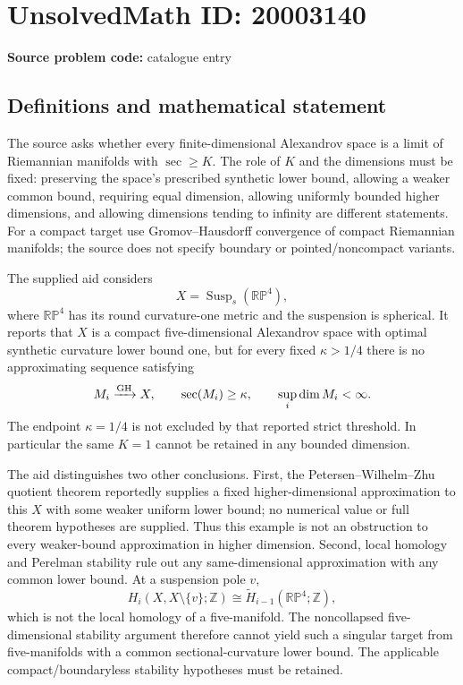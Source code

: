 \documentclass[11pt]{article}
\newcommand{\Z}{\mathbb{Z}}
\newcommand{\R}{\mathbb{R}}
\newcommand{\PP}{\mathbb{P}}
\begin{document}
\section*{UnsolvedMath ID: 20003140}
\textbf{Source problem code:} catalogue entry
\subsection{Definitions and mathematical statement}
The source asks whether every finite-dimensional Alexandrov space is a limit of Riemannian manifolds with \(\sec\ge K\). The role of \(K\) and the dimensions must be fixed: preserving the space's prescribed synthetic lower bound, allowing a weaker common bound, requiring equal dimension, allowing uniformly bounded higher dimensions, and allowing dimensions tending to infinity are different statements. For a compact target use Gromov--Hausdorff convergence of compact Riemannian manifolds; the source does not specify boundary or pointed/noncompact variants.

The supplied aid considers
\[
X=\operatorname{Susp}_s(\R\PP^4),
\]
where \(\R\PP^4\) has its round curvature-one metric and the suspension is spherical. It reports that \(X\) is a compact five-dimensional Alexandrov space with optimal synthetic curvature lower bound one, but for every fixed \(\kappa>1/4\) there is no approximating sequence satisfying
\[
M_i\xrightarrow{\rm GH}X,\qquad \sec(M_i)\ge\kappa,\qquad \sup_i\dim M_i<\infty.
\]
The endpoint \(\kappa=1/4\) is not excluded by that reported strict threshold. In particular the same \(K=1\) cannot be retained in any bounded dimension.

The aid distinguishes two other conclusions. First, the Petersen--Wilhelm--Zhu quotient theorem reportedly supplies a fixed higher-dimensional approximation to this \(X\) with some weaker uniform lower bound; no numerical value or full theorem hypotheses are supplied. Thus this example is not an obstruction to every weaker-bound approximation in higher dimension. Second, local homology and Perelman stability rule out any same-dimensional approximation with any common lower bound. At a suspension pole \(v\),
\[
H_i(X,X\setminus\{v\};\Z)\cong\widetilde H_{i-1}(\R\PP^4;\Z),
\]
which is not the local homology of a five-manifold. The noncollapsed five-dimensional stability argument therefore cannot yield such a singular target from five-manifolds with a common sectional-curvature lower bound. The applicable compact/boundaryless stability hypotheses must be retained.
\end{document}
